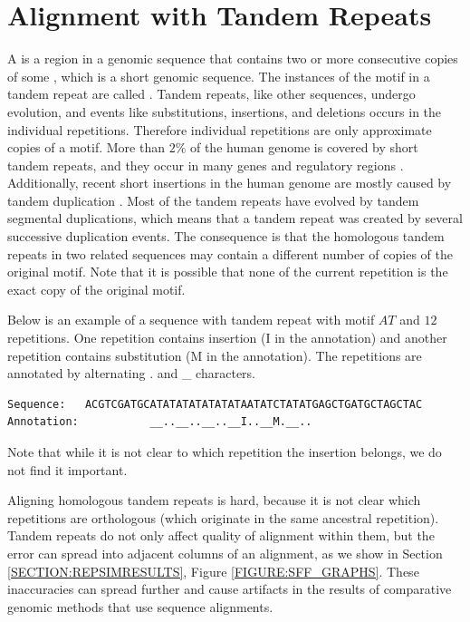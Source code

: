 \chapter{Alignment with Tandem Repeats} \label{CHAPTER:REP}

A  is a region in a genomic sequence that contains
two or more consecutive copies of some , which is a
short genomic sequence. The instances of the motif in a tandem repeat are
called .  Tandem repeats, like other sequences, undergo
evolution, and  events like substitutions, insertions, and deletions
occurs in the individual repetitions.  Therefore individual repetitions are
only approximate copies of a motif.  More than $2\%$ of the human genome is
covered by short tandem repeats, and they occur in many genes and regulatory
regions \cite{Gemayel2010}. Additionally, recent short insertions in the human
genome are mostly caused by tandem duplication \cite{Messer2007}. Most of the
tandem repeats have evolved by tandem segmental duplications, which means that
a tandem repeat was created by several successive duplication events. The
consequence is that the homologous tandem repeats in two related sequences may 
contain a different number of copies of the original motif. Note that it is
possible that none of the current repetition is the exact copy of the original
motif. 
\begin{example}
Below is an example of a sequence with tandem repeat with motif $AT$ and $12$
repetitions.  One repetition contains insertion (I in the annotation) and another 
repetition contains substitution (M in the annotation). The repetitions are
annotated by alternating . and \_ characters.
\begin{verbatim}
Sequence:   ACGTCGATGCATATATATATATATAATATCTATATGAGCTGATGCTAGCTAC
Annotation:           __..__..__..__I..__M.__..
\end{verbatim}
Note that while it is not clear to which repetition the insertion belongs, we
do not find it important.
\end{example}

Aligning homologous tandem repeats is hard, because it is not clear which
repetitions are orthologous (which originate in the same ancestral repetition).
Tandem repeats do not only affect quality of alignment within them, but the
error can spread into adjacent columns of an alignment, as we show in Section
\ref{SECTION:REPSIMRESULTS}, Figure \ref{FIGURE:SFF_GRAPHS}.  These
inaccuracies can spread further and cause artifacts in the results of
comparative genomic methods that use sequence alignments.

